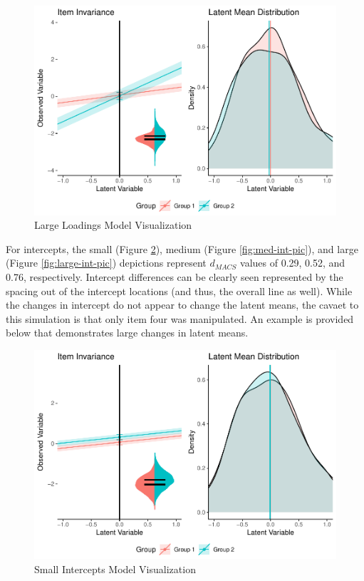 \documentclass[
  man]{apa6}
\begin{document}
\begin{figure}
\centering
\includegraphics{manuscript_files/figure-latex/large-load-pic-1.pdf}
\caption{\label{fig:large-load-pic}Large Loadings Model Visualization}
\end{figure}

For intercepts, the small (Figure \ref{fig:small-int-pic}), medium (Figure \ref{fig:med-int-pic}), and large (Figure \ref{fig:large-int-pic}) depictions represent \(d_{MACS}\) values of 0.29, 0.52, and 0.76, respectively. Intercept differences can be clearly seen represented by the spacing out of the intercept locations (and thus, the overall line as well). While the changes in intercept do not appear to change the latent means, the cavaet to this simulation is that only item four was manipulated. An example is provided below that demonstrates large changes in latent means.

\begin{figure}
\centering
\includegraphics{manuscript_files/figure-latex/small-int-pic-1.pdf}
\caption{\label{fig:small-int-pic}Small Intercepts Model Visualization}
\end{figure}
\end{document}
